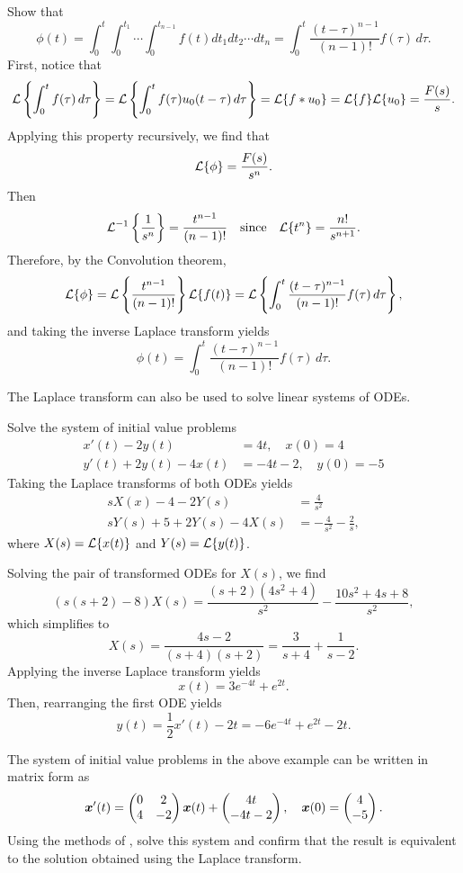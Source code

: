 \begin{eg}
	Show that
	\[
		\phi(t) = \int_0^t \int_0^{t_1} \cdots \int_0^{t_{n-1}} f(t) dt_1 dt_2 \cdots dt_n = \int_0^t \frac{(t-\tau)^{n-1}}{(n-1)!} f(\tau)\,d\tau.
	\]
	First, notice that
	\[
		\mathcal{L}\left\{\int_0^t f(\tau)\,d\tau\right\} = \mathcal{L}\left\{\int_0^t f(\tau) u_0(t-\tau) \,d\tau\right\} =  \mathcal{L}\{f*u_0\} = \mathcal{L}\{f\}\mathcal{L}\{u_0\} = \frac{F(s)}{s}.
	\]
	Applying this property recursively, we find that
	\[
		\mathcal{L}\{\phi\} = \frac{F(s)}{s^n}.
	\]
	Then
	\[
		\mathcal{L}^{-1}\left\{\frac{1}{s^n}\right\} = \frac{t^{n-1}}{(n-1)!} \quad\text{since}\quad \mathcal{L}\{t^n\} = \frac{n!}{s^{n+1}}.
	\]
	Therefore, by the Convolution theorem,
	\[
		\mathcal{L}\{\phi\} = \mathcal{L}\left\{\frac{t^{n-1}}{(n-1)!}\right\}\mathcal{L}\{f(t)\} = \mathcal{L}\left\{\int_0^t \frac{(t-\tau)^{n-1}}{(n-1)!} f(\tau)\,d\tau\right\},
	\]
	and taking the inverse Laplace transform yields
	\[
		\phi(t) = \int_0^t \frac{(t-\tau)^{n-1}}{(n-1)!} f(\tau)\,d\tau.
	\]
\end{eg}

The Laplace transform can also be used to solve linear systems of ODEs.

\begin{eg}
	Solve the system of initial value problems
	\begin{align*}
		x'(t) - 2y(t) &= 4t, \quad x(0)=4 \\
		y'(t) + 2y(t) - 4x(t) &= -4t-2, \quad y(0)=-5
	\end{align*}
	Taking the Laplace transforms of both ODEs yields
	\begin{align*}
		sX(x) - 4 - 2Y(s) &= \frac{4}{s^2} \\
		sY(s) + 5 + 2Y(s) - 4X(s) &= -\frac{4}{s^2} - \frac{2}{s},
	\end{align*}
	where $X(s) = \mathcal{L}\{x(t)\}$ and $Y(s) = \mathcal{L}\{y(t)\}$.
	
	Solving the pair of transformed ODEs for $X(s)$, we find
	\[
		(s(s+2)-8)X(s) = \frac{(s+2)(4s^2+4)}{s^2} - \frac{10s^2+4s+8}{s^2},
	\]
	which simplifies to
	\[
		X(s) = \frac{4s-2}{(s+4)(s+2)} = \frac{3}{s+4} + \frac{1}{s-2}.
	\]
	Applying the inverse Laplace transform yields
	\[
		x(t) = 3e^{-4t} + e^{2t}.
	\]
	Then, rearranging the first ODE yields
	\[
		y(t) = \frac12 x'(t) - 2t = -6e^{-4t} + e^{2t} - 2t.
	\]
\end{eg}

\begin{exercise}
	The system of initial value problems in the above example can be written in matrix form as
	\[
		\bm{x}'(t) = \begin{pmatrix}0 & 2 \\ 4 & -2\end{pmatrix}\bm{x}(t) + \begin{pmatrix}4t \\ -4t - 2\end{pmatrix}, \quad \bm{x}(0) = \begin{pmatrix}4 \\ -5\end{pmatrix}.
	\]
	Using the methods of , solve this system and confirm that the result is equivalent to the solution obtained using the Laplace transform.
\end{exercise}

